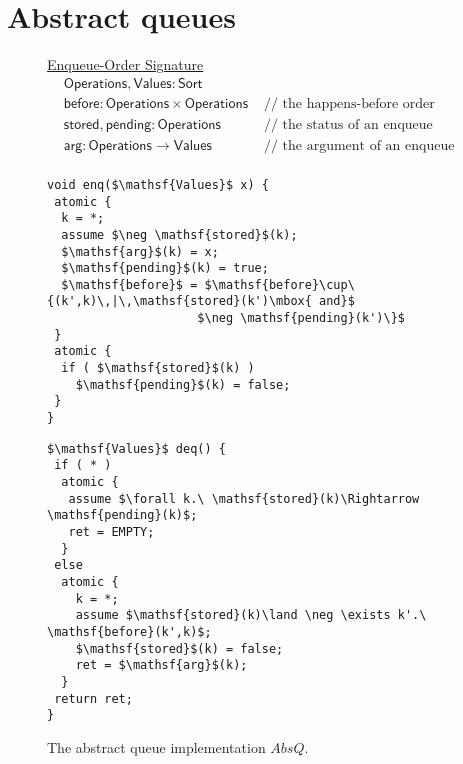 \section{Abstract queues}


\begin{figure}[t]
{	\centering
	\underline{Enqueue-Order Signature}
	\begin{align*}
		& \mathsf{Operations}, \mathsf{Values} : \mathsf{Sort} \\
		& \mathsf{before} : \mathsf{Operations} \times \mathsf{Operations} &\mbox{ // the happens-before order between enqueues} \\
		& \mathsf{stored}, \mathsf{pending} : \mathsf{Operations} &\mbox{ // the status of an enqueue} \\
		& \mathsf{arg} : \mathsf{Operations} \rightarrow \mathsf{Values} &\mbox{ // the argument of an enqueue} \\
	\end{align*}
}

\begin{minipage}[t]{6cm}
\begin{lstlisting}
void enq($\mathsf{Values}$ x) {
 atomic {
  k = *; 
  assume $\neg \mathsf{stored}$(k);
  $\mathsf{arg}$(k) = x;
  $\mathsf{pending}$(k) = true;
  $\mathsf{before}$ = $\mathsf{before}\cup\{(k',k)\,|\,\mathsf{stored}(k')\mbox{ and}$
                     $\neg \mathsf{pending}(k')\}$  
 }
 atomic {
  if ( $\mathsf{stored}$(k) )
    $\mathsf{pending}$(k) = false;
 }
}
\end{lstlisting}
\end{minipage}
\begin{minipage}[t]{5cm}
\begin{lstlisting}
$\mathsf{Values}$ deq() {
 if ( * )
  atomic {
   assume $\forall k.\ \mathsf{stored}(k)\Rightarrow \mathsf{pending}(k)$;
   ret = EMPTY;
  }
 else 
  atomic {
    k = *;
    assume $\mathsf{stored}(k)\land \neg \exists k'.\ \mathsf{before}(k',k)$;
    $\mathsf{stored}$(k) = false;
    ret = $\mathsf{arg}$(k);
  }
 return ret;
}
\end{lstlisting}
\end{minipage}

	\caption{The abstract queue implementation $AbsQ$.}
	\label{fig:signatures}
\end{figure}
